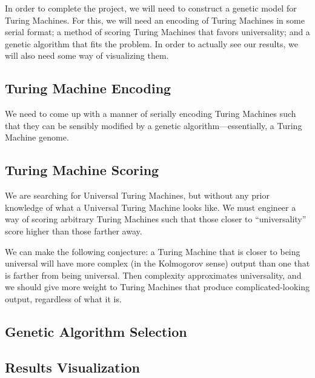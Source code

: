 In order to complete the project, we will need to construct a genetic
model for Turing Machines. For this, we will need an encoding of Turing
Machines in some serial format; a method of scoring Turing Machines that
favors universality; and a genetic algorithm that fits the problem. In
order to actually see our results, we will also need some way of
visualizing them.

\subsection{Turing Machine Encoding} 

We need to come up with a manner of serially encoding Turing Machines
such that they can be sensibly modified by a genetic
algorithm---essentially, a Turing Machine genome.

\subsection{Turing Machine Scoring} 

We are searching for Universal Turing Machines, but without any prior
knowledge of what a Universal Turing Machine looks like. We must
engineer a way of scoring arbitrary Turing Machines such that those
closer to ``universality'' score higher than those farther away.

We can make the following conjecture: a Turing Machine that is closer to
being universal will have more complex (in the Kolmogorov sense) output
than one that is farther from being universal. Then complexity
approximates universality, and we should give more weight to Turing
Machines that produce complicated-looking output, regardless of what it
is.

\subsection{Genetic Algorithm Selection}
\subsection{Results Visualization}
